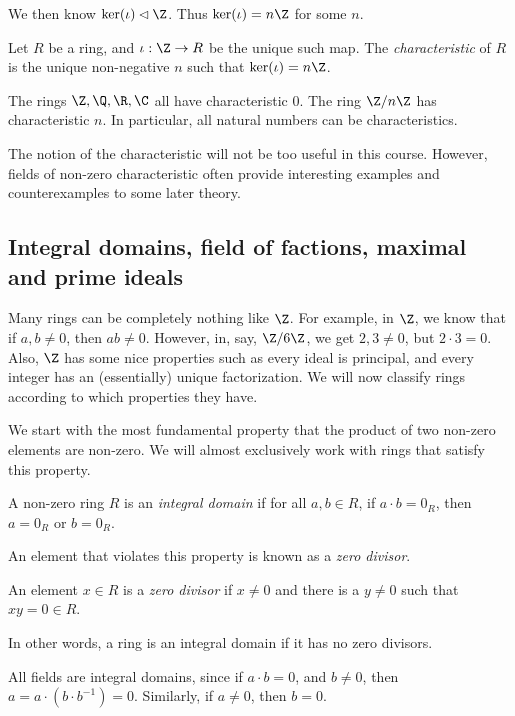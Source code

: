 \documentclass[a4paper]{article}
\begin{document}
We then know $\ker(\iota) \lhd \Z$. Thus $\ker(\iota) = n\Z$ for some $n$.

\begin{defi}
  Let $R$ be a ring, and $\iota: \Z \to R$ be the unique such map. The \emph{characteristic} of $R$ is the unique non-negative $n$ such that $\ker (\iota) = n\Z$.
\end{defi}

\begin{eg}
  The rings $\Z, \Q, \R, \C$ all have characteristic $0$. The ring $\Z / n\Z$ has characteristic $n$. In particular, all natural numbers can be characteristics.
\end{eg}
The notion of the characteristic will not be too useful in this course. However, fields of non-zero characteristic often provide interesting examples and counterexamples to some later theory.

\subsection{Integral domains, field of factions, maximal and prime ideals}
Many rings can be completely nothing like $\Z$. For example, in $\Z$, we know that if $a, b \not= 0$, then $ab \not= 0$. However, in, say, $\Z/6\Z$, we get $2, 3 \not= 0$, but $2 \cdot 3 = 0$. Also, $\Z$ has some nice properties such as every ideal is principal, and every integer has an (essentially) unique factorization. We will now classify rings according to which properties they have.

We start with the most fundamental property that the product of two non-zero elements are non-zero. We will almost exclusively work with rings that satisfy this property.
\begin{defi}
  A non-zero ring $R$ is an \emph{integral domain} if for all $a, b \in R$, if $a \cdot b = 0_R$, then $a = 0_R$ or $b = 0_R$.
\end{defi}

An element that violates this property is known as a \emph{zero divisor}.
\begin{defi}
  An element $x \in R$ is a \emph{zero divisor} if $x \not = 0$ and there is a $y \not= 0$ such that $xy = 0 \in R$.
\end{defi}
In other words, a ring is an integral domain if it has no zero divisors.

\begin{eg}
  All fields are integral domains, since if $a \cdot b = 0$, and $b \not= 0$, then $a = a\cdot (b\cdot b^{-1}) = 0$. Similarly, if $a\not= 0$, then $b = 0$.
\end{eg}
\end{document}
